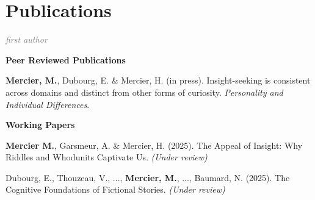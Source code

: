 \documentclass[letterpaper,11pt]{article}
\newcommand{\resumeItem}[1]{
  \item\small{
    {#1 \vspace{-2pt}}
  }
}
\newcommand{\resumeItemWithYear}[3][ ]{ %
  \item\small{
    #2 \hfill {\small #3} \\
    #1
  }
}
\newcommand{\resumePublicationHeading}[1]{
  \vspace{5pt} %
  \noindent\textbf{\small #1} %
  \vspace{2pt} %
}
\begin{document}
\section{Publications}


\small

\noindent\textcolor{gray}{\textit{\footnotemark[1]first author}}
\vspace{5pt} %

\resumePublicationHeading{Peer Reviewed Publications}
\begin{etaremune}
    \resumeItem{\textbf{Mercier, M.\footnotemark[1]}, Dubourg, E. \& Mercier, H. (in press). Insight-seeking is consistent across domains and distinct from other forms of curiosity. \emph{Personality and Individual Differences}.
    }
\end{etaremune}


\resumePublicationHeading{Working Papers}
\begin{etaremune}
    \resumeItem{\textbf{Mercier M.\footnotemark[1]}, Garsmeur, A. \& Mercier, H. (2025). The Appeal of Insight: Why Riddles and Whodunits Captivate Us. \emph{(Under review)}
    }
    \resumeItem{Dubourg, E., Thouzeau, V., ..., \textbf{Mercier, M.}, ..., Baumard, N. (2025). The Cognitive Foundations of Fictional Stories. \emph{(Under review)}
    }

\end{etaremune}






\end{document}
